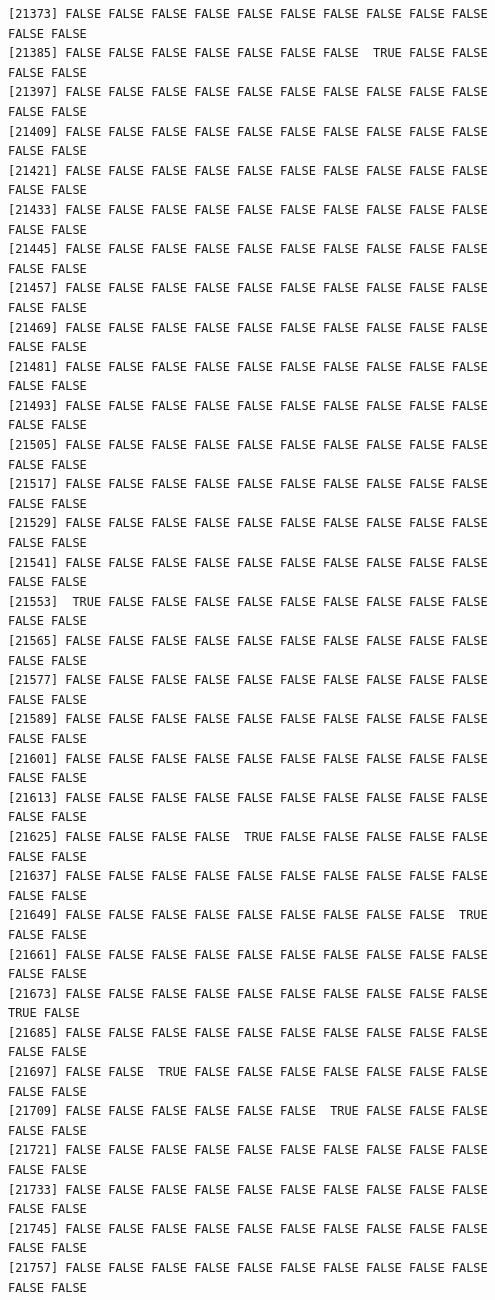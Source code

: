 \documentclass[
  a4paper,
  DIV=11,
  numbers=noendperiod]{scrartcl}
\begin{document}
\begin{verbatim}
[21373] FALSE FALSE FALSE FALSE FALSE FALSE FALSE FALSE FALSE FALSE FALSE FALSE
[21385] FALSE FALSE FALSE FALSE FALSE FALSE FALSE  TRUE FALSE FALSE FALSE FALSE
[21397] FALSE FALSE FALSE FALSE FALSE FALSE FALSE FALSE FALSE FALSE FALSE FALSE
[21409] FALSE FALSE FALSE FALSE FALSE FALSE FALSE FALSE FALSE FALSE FALSE FALSE
[21421] FALSE FALSE FALSE FALSE FALSE FALSE FALSE FALSE FALSE FALSE FALSE FALSE
[21433] FALSE FALSE FALSE FALSE FALSE FALSE FALSE FALSE FALSE FALSE FALSE FALSE
[21445] FALSE FALSE FALSE FALSE FALSE FALSE FALSE FALSE FALSE FALSE FALSE FALSE
[21457] FALSE FALSE FALSE FALSE FALSE FALSE FALSE FALSE FALSE FALSE FALSE FALSE
[21469] FALSE FALSE FALSE FALSE FALSE FALSE FALSE FALSE FALSE FALSE FALSE FALSE
[21481] FALSE FALSE FALSE FALSE FALSE FALSE FALSE FALSE FALSE FALSE FALSE FALSE
[21493] FALSE FALSE FALSE FALSE FALSE FALSE FALSE FALSE FALSE FALSE FALSE FALSE
[21505] FALSE FALSE FALSE FALSE FALSE FALSE FALSE FALSE FALSE FALSE FALSE FALSE
[21517] FALSE FALSE FALSE FALSE FALSE FALSE FALSE FALSE FALSE FALSE FALSE FALSE
[21529] FALSE FALSE FALSE FALSE FALSE FALSE FALSE FALSE FALSE FALSE FALSE FALSE
[21541] FALSE FALSE FALSE FALSE FALSE FALSE FALSE FALSE FALSE FALSE FALSE FALSE
[21553]  TRUE FALSE FALSE FALSE FALSE FALSE FALSE FALSE FALSE FALSE FALSE FALSE
[21565] FALSE FALSE FALSE FALSE FALSE FALSE FALSE FALSE FALSE FALSE FALSE FALSE
[21577] FALSE FALSE FALSE FALSE FALSE FALSE FALSE FALSE FALSE FALSE FALSE FALSE
[21589] FALSE FALSE FALSE FALSE FALSE FALSE FALSE FALSE FALSE FALSE FALSE FALSE
[21601] FALSE FALSE FALSE FALSE FALSE FALSE FALSE FALSE FALSE FALSE FALSE FALSE
[21613] FALSE FALSE FALSE FALSE FALSE FALSE FALSE FALSE FALSE FALSE FALSE FALSE
[21625] FALSE FALSE FALSE FALSE  TRUE FALSE FALSE FALSE FALSE FALSE FALSE FALSE
[21637] FALSE FALSE FALSE FALSE FALSE FALSE FALSE FALSE FALSE FALSE FALSE FALSE
[21649] FALSE FALSE FALSE FALSE FALSE FALSE FALSE FALSE FALSE  TRUE FALSE FALSE
[21661] FALSE FALSE FALSE FALSE FALSE FALSE FALSE FALSE FALSE FALSE FALSE FALSE
[21673] FALSE FALSE FALSE FALSE FALSE FALSE FALSE FALSE FALSE FALSE  TRUE FALSE
[21685] FALSE FALSE FALSE FALSE FALSE FALSE FALSE FALSE FALSE FALSE FALSE FALSE
[21697] FALSE FALSE  TRUE FALSE FALSE FALSE FALSE FALSE FALSE FALSE FALSE FALSE
[21709] FALSE FALSE FALSE FALSE FALSE FALSE  TRUE FALSE FALSE FALSE FALSE FALSE
[21721] FALSE FALSE FALSE FALSE FALSE FALSE FALSE FALSE FALSE FALSE FALSE FALSE
[21733] FALSE FALSE FALSE FALSE FALSE FALSE FALSE FALSE FALSE FALSE FALSE FALSE
[21745] FALSE FALSE FALSE FALSE FALSE FALSE FALSE FALSE FALSE FALSE FALSE FALSE
[21757] FALSE FALSE FALSE FALSE FALSE FALSE FALSE FALSE FALSE FALSE FALSE FALSE

\end{verbatim}
\end{document}
